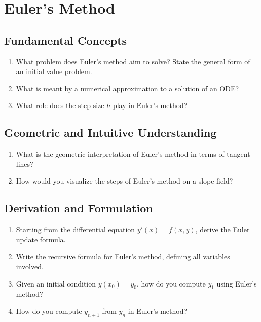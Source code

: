\section{Euler's Method}

\subsection{Fundamental Concepts}
\begin{enumerate}
  \item What problem does Euler's method aim to solve? State the general form of an initial value problem.
  \item What is meant by a numerical approximation to a solution of an ODE?
  \item What role does the step size \(h\) play in Euler's method?
\end{enumerate}

\subsection{Geometric and Intuitive Understanding}
\begin{enumerate}[resume]
  \item What is the geometric interpretation of Euler's method in terms of tangent lines?
  \item How would you visualize the steps of Euler's method on a slope field?
\end{enumerate}

\subsection{Derivation and Formulation}
\begin{enumerate}[resume]
  \item Starting from the differential equation \(y'(x) = f(x,y)\), derive the Euler update formula.
  \item Write the recursive formula for Euler's method, defining all variables involved.
  \item Given an initial condition \(y(x_{0}) = y_{0}\), how do you compute \(y_{1}\) using Euler's method?
  \item How do you compute \(y_{n+1}\) from \(y_{n}\) in Euler's method?
\end{enumerate}

